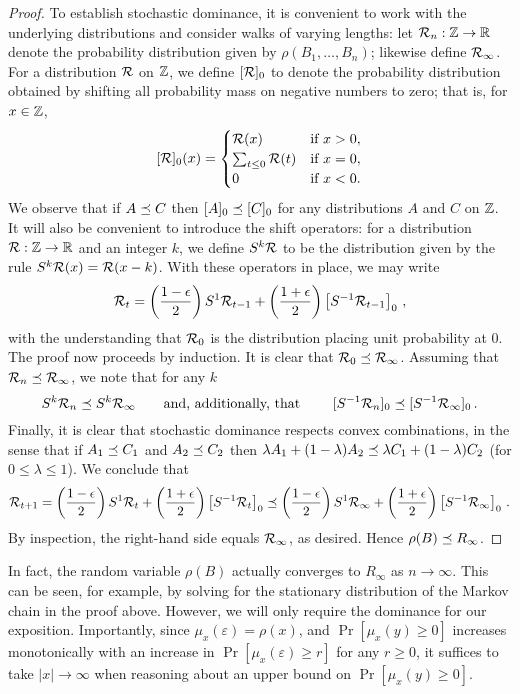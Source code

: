 \begin{proof}
  To establish stochastic dominance, it is convenient to work with the
  underlying distributions and consider walks of varying lengths: let
  $\mathcal{R}_n: \mathbb{Z} \rightarrow \mathbb{R}$ denote the probability distribution given by
  $\rho(B_1, \ldots, B_n)$; likewise
  define $\mathcal{R}_\infty$. For a distribution $\mathcal{R}$ on $\mathbb{Z}$, we define $[\mathcal{R}]_0$
  to denote the probability distribution obtained by shifting all
  probability mass on negative numbers to zero; that is, for $x \in \mathbb{Z}$,
  \[
    [\mathcal{R}]_0(x) = \begin{cases} \mathcal{R}(x) & \text{if $x > 0$},\\
      \sum_{t \leq 0} \mathcal{R}(t) & \text{if $x = 0$},\\
      0 & \text{if $x < 0$.}
    \end{cases}
  \]
  We observe that if $A \preceq C$ then $[A]_0 \preceq [C]_0$ for any
  distributions $A$ and $C$ on $\mathbb{Z}$. It will also be convenient to
  introduce the shift operators: for a distribution
  $\mathcal{R}: \mathbb{Z} \rightarrow \mathbb{R}$ and an integer $k$, we define $S^k\mathcal{R}$ to be the
  distribution given by the rule $S^k\mathcal{R}(x) = \mathcal{R}(x-k)$. With these
  operators in place, we may write
  \[
    \mathcal{R}_t = \left(\frac{1 - \epsilon}{2}\right) S^1 \mathcal{R}_{t-1} +
      \left(\frac{1 + \epsilon}{2}\right) \left[S^{-1}\mathcal{R}_{t-1} \right]_0\,,
  \]
  with the understanding that $\mathcal{R}_0$ is the distribution placing unit probability at $0$. The proof now proceeds by induction. It is clear that $\mathcal{R}_0 \preceq \mathcal{R}_\infty$. Assuming that $\mathcal{R}_n \preceq \mathcal{R}_\infty$, we note that for any $k$
  \[
    S^k \mathcal{R}_n \preceq S^k \mathcal{R}_\infty \qquad \text{and, additionally, that
    }\qquad [S^{-1}\mathcal{R}_n]_0 \preceq [S^{-1}\mathcal{R}_{\infty}]_0\,.
  \]
  Finally, it is clear that stochastic dominance respects convex combinations, 
  in the sense that if $A_1 \preceq C_1$ and $A_2 \preceq C_2$ then 
  $\lambda A_1 + (1-\lambda) A_2 \preceq \lambda C_1 + (1-\lambda) C_2$ (for $0 \leq \lambda \leq 1$). We conclude that
  \[
    \mathcal{R}_{t+1} = \left(\frac{1 - \epsilon}{2}\right) S^1 \mathcal{R}_{t} +
      \left(\frac{1 + \epsilon}{2}\right) \left[S^{-1}\mathcal{R}_{t} \right]_0 \preceq \left(\frac{1 - \epsilon}{2}\right) S^1 \mathcal{R}_{\infty} +
      \left(\frac{1 + \epsilon}{2}\right) \left[S^{-1}\mathcal{R}_{\infty} \right]_0 
      \,.
  \]
  By inspection, the right-hand side equals $\mathcal{R}_{\infty}$, as desired. 
  Hence $\rho(B) \preceq R_\infty$.
\end{proof}

  In fact, the random variable $\rho(B)$
  actually converges to $R_\infty$ as $n \rightarrow \infty$. 
  This can be seen, for example, 
  by solving for the stationary distribution of the Markov chain in the proof above. 
  However, we will only require the dominance for our exposition. 
  Importantly, since $\mu_x(\varepsilon) = \rho(x)$, and 
  $\Pr[\mu_x(y) \geq 0]$ increases monotonically 
  with an increase in $\Pr[\mu_x(\varepsilon) \geq r]$ for any $r \geq 0$, 
  it suffices to take $|x| \rightarrow \infty$ 
  when reasoning about an upper bound on $\Pr[\mu_x(y) \geq 0]$.